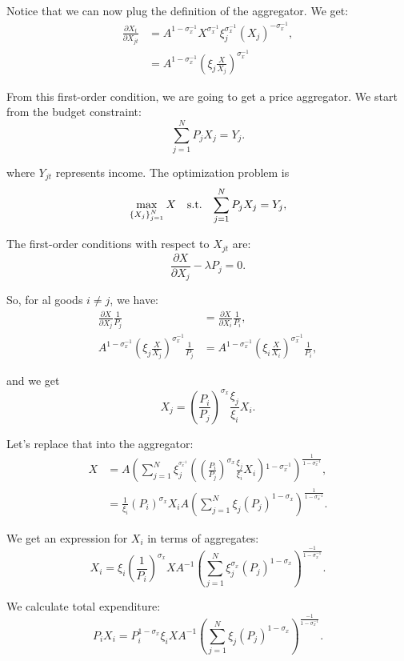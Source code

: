 Notice that we can now plug the definition of the aggregator. We
get:
\begin{align*}
\frac{\partial X_{t}}{\partial X_{jt}} & =A^{1-\sigma_{x}^{-1}}X^{\sigma_{x}^{-1}}\xi_{j}^{\sigma_{x}^{-1}}(X_{j})^{-\sigma_{x}^{-1}},\\
 & =A^{1-\sigma_{x}^{-1}}\left(\xi_{j}\frac{{X}}{X_{j}}\right)^{\sigma_{x}^{-1}}
\end{align*}

From this first-order condition, we are going to get a price aggregator. We start from the budget constraint:
\[
\sum_{j=1}^{N}P_{j}X_{j}=Y_{j}.
\]

where $Y_{jt}$ represents income. The optimization problem is
\[
\max_{\left\{ X_{j}\right\} _{j=1}^{N}}X\quad\text{{s.t.}\ensuremath{\quad\sum_{j=1}^{N}P_{j}X_{j}=Y_{j}}},
\]

The first-order conditions with respect to $X_{jt}$ are:
\[
\frac{\partial X}{\partial X_{j}}-\lambda P_{j}=0.
\]

So, for al goods $i\ne j$, we have:
\begin{align*}
\frac{\partial X}{\partial X_{j}}\frac{1}{P_{j}} & =\frac{\partial X}{\partial X_{i}}\frac{1}{P_{i}},\\
A^{1-\sigma_{x}^{-1}}\left(\xi_{j}\frac{{X}}{X_{j}}\right)^{\sigma_{x}^{-1}}\frac{1}{P_{j}} & =A^{1-\sigma_{x}^{-1}}\left(\xi_{i}\frac{{X}}{X_{i}}\right)^{\sigma_{x}^{-1}}\frac{1}{P_{i}},
\end{align*}

and we get
\[
X_{j}=\left(\frac{P_{i}}{P_{j}}\right)^{\sigma_{x}}\frac{\xi_{j}}{\xi_{i}}X_{i}.
\]

Let's replace that into the aggregator:
\begin{align*}
X & =A\left(\sum_{j=1}^{N}\xi_{j}^{^{\sigma_{x}^{-1}}}\left(\left(\frac{P_{i}}{P_{j}}\right)^{\sigma_{x}}\frac{\xi_{j}}{\xi_{i}}X_{i}\right){}^{1-\sigma_{x}^{-1}}\right)^{\frac{1}{1-\sigma_{x}^{-1}}},\\
 & =\frac{1}{\xi_{i}}\left(P_{i}\right)^{\sigma_{x}}X_{i}A\left(\sum_{j=1}^{N}\xi_{j}\left(P_{j}\right)^{1-\sigma_{x}}\right)^{\frac{1}{1-\sigma_{x}^{-1}}}.
\end{align*}

We get an expression for $X_{i}$ in terms of aggregates:
\[
X_{i}=\xi_{i}\left(\frac{1}{P_{i}}\right)^{\sigma_{x}}XA^{-1}\left(\sum_{j=1}^{N}\xi_{j}^{\sigma_{x}}\left(P_{j}\right)^{1-\sigma_{x}}\right)^{\frac{-1}{1-\sigma_{x}^{-1}}}.
\]

We calculate total expenditure:
\[
P_{i}X_{i}=P_{i}^{1-\sigma_{x}}\xi_{i}XA^{-1}\left(\sum_{j=1}^{N}\xi_{j}\left(P_{j}\right)^{1-\sigma_{x}}\right)^{\frac{-1}{1-\sigma_{x}^{-1}}}.
\]


